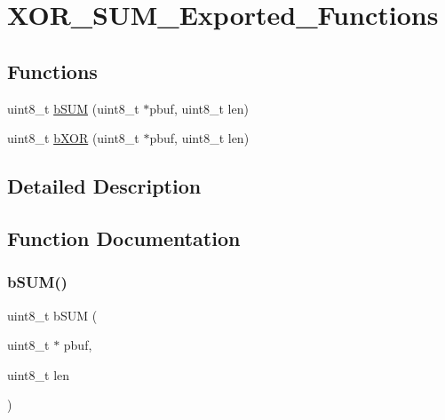 \hypertarget{group___x_o_r___s_u_m___exported___functions}{}\section{X\+O\+R\+\_\+\+S\+U\+M\+\_\+\+Exported\+\_\+\+Functions}
\label{group___x_o_r___s_u_m___exported___functions}
\subsection*{Functions}
\begin{DoxyCompactItemize}
\item 
uint8\+\_\+t \mbox{\hyperlink{group___x_o_r___s_u_m___exported___functions_ga2a8d353f13d1a561f2aa9d5a3242f736}{b\+S\+UM}} (uint8\+\_\+t $\ast$pbuf, uint8\+\_\+t len)
\item 
uint8\+\_\+t \mbox{\hyperlink{group___x_o_r___s_u_m___exported___functions_gad8a63cb1a3c46e95ec3548168f8b244e}{b\+X\+OR}} (uint8\+\_\+t $\ast$pbuf, uint8\+\_\+t len)
\end{DoxyCompactItemize}


\subsection{Detailed Description}


\subsection{Function Documentation}
\mbox{\label{group___x_o_r___s_u_m___exported___functions_ga2a8d353f13d1a561f2aa9d5a3242f736}} 
\subsubsection{\texorpdfstring{b\+S\+U\+M()}{bSUM()}}
{\footnotesize\ttfamily uint8\+\_\+t b\+S\+UM (\begin{DoxyParamCaption}\item[{uint8\+\_\+t $\ast$}]{pbuf,  }\item[{uint8\+\_\+t}]{len }\end{DoxyParamCaption})}

